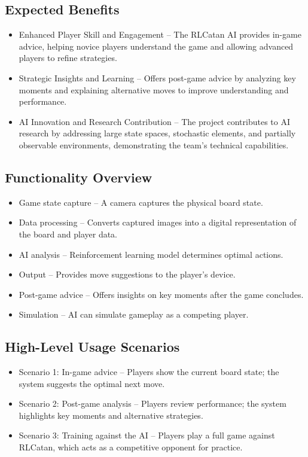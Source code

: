 \documentclass{article}
\begin{document}
\subsection{Expected Benefits}\label{subsec:expected-benefits}
\begin{itemize}
    \item {Enhanced Player Skill and Engagement} – The RLCatan AI provides in-game advice, helping novice players understand the game and allowing advanced players to refine strategies.
    \item {Strategic Insights and Learning} – Offers post-game advice by analyzing key moments and explaining alternative moves to improve understanding and performance.
    \item {AI Innovation and Research Contribution} – The project contributes to AI research by addressing large state spaces, stochastic elements, and partially observable environments, demonstrating the team's technical capabilities.
\end{itemize}

\subsection{Functionality Overview}\label{subsec:functionality-overview}
\begin{itemize}
    \item {Game state capture} – A camera captures the physical board state.
    \item {Data processing} – Converts captured images into a digital representation of the board and player data.
    \item {AI analysis} – Reinforcement learning model determines optimal actions.
    \item {Output} – Provides move suggestions to the player's device.
    \item {Post-game advice} – Offers insights on key moments after the game concludes.
    \item {Simulation} – AI can simulate gameplay as a competing player.
\end{itemize}

\subsection{High-Level Usage Scenarios}\label{subsec:high-level-usage-scenarios}
\begin{itemize}
    \item {Scenario 1: In-game advice} – Players show the current board state; the system suggests the optimal next move.
    \item {Scenario 2: Post-game analysis} – Players review performance; the system highlights key moments and alternative strategies.
    \item {Scenario 3: Training against the AI} – Players play a full game against RLCatan, which acts as a competitive opponent for practice.
\end{itemize}
\end{document}
